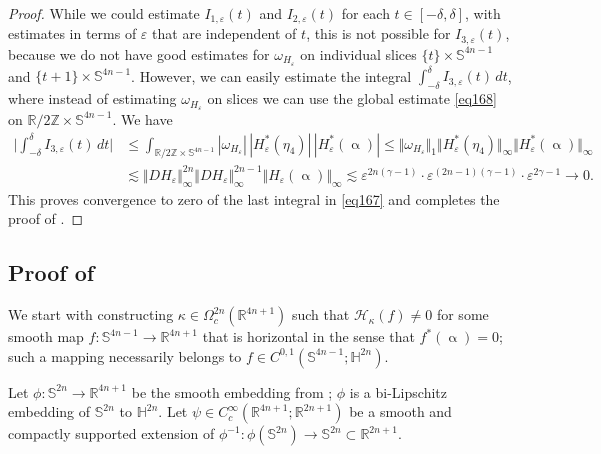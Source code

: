 \documentclass[intlimits,12pt,reqno]{amsart}
\newcommand{\Sph}{\mathbb S}
\newcommand{\bbbh}{\mathbb H}
\newcommand{\R}{\mathbb R}
\newcommand{\eps}{\varepsilon}
\numberwithin{equation}{section}
\theoremstyle{definition}
\newcommand{\HI}{\mathcal{H}}
\begin{document}
\begin{proof}
While we could estimate $I_{1,\eps}(t)$ and $I_{2,\eps}(t)$ for each $t\in [-\delta,\delta]$, with estimates in terms of $\eps$ that are independent of $t$, this is not possible for $I_{3,\eps}(t)$, because we do not have good estimates for $\omega_{H_\eps}$ on individual slices $\{t\}\times\Sph^{4n-1}$ and $\{t+1\}\times\Sph^{4n-1}$. However, we can easily estimate the integral $\int_{-\delta}^\delta I_{3,\eps}(t)\, dt$, where instead of estimating $\omega_{H_\eps}$ on slices we can use the global estimate \eqref{eq168} on $\R/2\mathbb{Z}\times \Sph^{4n-1}$. We have
\[
\begin{split}
\Bigg|\int_{-\delta}^\delta I_{3,\eps}(t)\, dt\bigg|
&\leq
\int_{\R/2\mathbb{Z}\times\Sph^{4n-1}} |\omega_{H_\eps}|\, |H_\eps^*(\eta_4)|\, |H_\eps^*(\upalpha)|
\leq
\Vert\omega_{H_\eps}\Vert_1\Vert H_\eps^*(\eta_4)\Vert_\infty\Vert H_\eps^*(\upalpha)\Vert_\infty \\
&\lesssim 
\Vert DH_{\eps}\Vert_\infty^{2n}\Vert DH_{\eps}\Vert_\infty^{2n-1}\Vert H_{\eps}(\upalpha)\Vert_\infty
\lesssim
\eps^{2n(\gamma-1)}\cdot\eps^{(2n-1)(\gamma-1)}\cdot\eps^{2\gamma-1}\to 0.
\end{split}
\]
This proves convergence to zero of the last integral in \eqref{eq167} and completes the proof of
.
\end{proof}

\subsection{Proof of }
\label{LastProof}
We start with constructing $\kappa\in\Omega_c^{2n}(\R^{4n+1})$ such that $\HI_\kappa(f)\neq 0$ for some smooth map $f:\Sph^{4n-1}\to\R^{4n+1}$ that is horizontal in the sense that $f^*(\upalpha)=0$; such a mapping necessarily belongs to $f\in C^{0,1}(\Sph^{4n-1};\bbbh^{2n})$.

Let $\phi:\Sph^{2n}\to\R^{4n+1}$ be the smooth embedding from ; $\phi$ is a bi-Lipschitz embedding of $\Sph^{2n}$ to $\bbbh^{2n}$. Let $\psi\in C_c^\infty(\R^{4n+1};\R^{2n+1})$ be a smooth and compactly supported extension of $\phi^{-1}:\phi(\Sph^{2n})\to\Sph^{2n}\subset\R^{2n+1}$.
\end{document}
